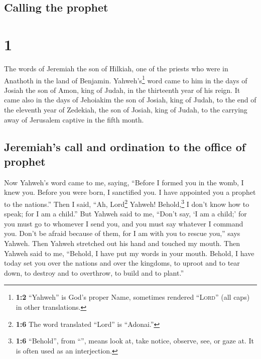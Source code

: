\begin{paracol}{2}
\switchcolumn
\begin{otherlanguage}{english}

\hypertarget{calling-the-prophet}{%
\subsection{Calling the prophet}\label{calling-the-prophet}}

\hypertarget{section-1}{%
\section{1}\label{section-1}}

 The words of Jeremiah the son of Hilkiah, one of the
priests who were in Anathoth in the land of Benjamin. 
Yahweh's\footnote{\textbf{1:2} ``Yahweh'' is God's proper Name,
  sometimes rendered ``\textsc{Lord}'' (all caps) in other translations.}
word came to him in the days of Josiah the son of Amon, king of Judah,
in the thirteenth year of his reign.  It came also in the
days of Jehoiakim the son of Josiah, king of Judah, to the end of the
eleventh year of Zedekiah, the son of Josiah, king of Judah, to the
carrying away of Jerusalem captive in the fifth month.

\hypertarget{jeremiahs-call-and-ordination-to-the-office-of-prophet}{%
\subsection{Jeremiah's call and ordination to the office of
prophet}\label{jeremiahs-call-and-ordination-to-the-office-of-prophet}}

 Now Yahweh's word came to me, saying, 
``Before I formed you in the womb, I knew you. Before you were born, I
sanctified you. I have appointed you a prophet to the nations.''
 Then I said, ``Ah, Lord\footnote{\textbf{1:6} The word
  translated ``Lord'' is ``Adonai.''} Yahweh! Behold,\footnote{\textbf{1:6}
  ``Behold'', from ``'', means look at, take notice,
  observe, see, or gaze at. It is often used as an interjection.} I
don't know how to speak; for I am a child.''  But Yahweh
said to me, ``Don't say, `I am a child;' for you must go to whomever I
send you, and you must say whatever I command you.  Don't
be afraid because of them, for I am with you to rescue you,'' says
Yahweh.  Then Yahweh stretched out his hand and touched my
mouth. Then Yahweh said to me, ``Behold, I have put my words in your
mouth.  Behold, I have today set you over the nations and
over the kingdoms, to uproot and to tear down, to destroy and to
overthrow, to build and to plant.''


\end{otherlanguage}
\end{paracol}
